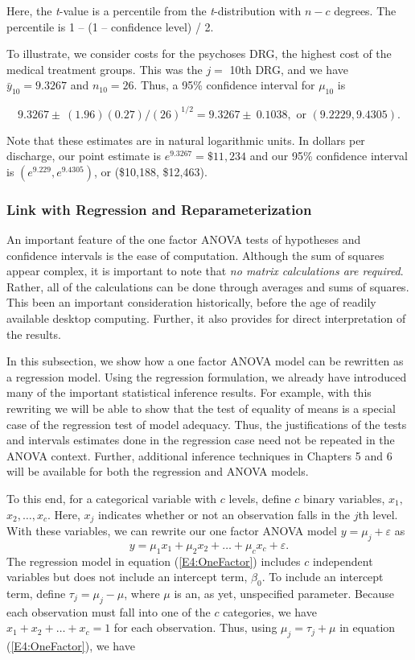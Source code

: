 \noindent Here, the \textit{t}-value is a percentile from the
\textit{t}-distribution with $n-c$ degrees. The percentile is 1 --
(1 -- confidence level) / 2.

To illustrate, we consider costs for the psychoses DRG, the highest cost of
the medical treatment groups. This was the $j=$ 10th DRG, and we have $\bar{y%
}_{10}=9.3267$ and $n_{10}=26$. Thus, a 95\% confidence interval for $\mu
_{10}$ is

\begin{equation*}
9.3267\pm \ (1.96)(0.27)/(26)^{1/2}=9.3267\pm \ 0.1038,\text{ or }%
(9.2229,9.4305).
\end{equation*}

Note that these estimates are in natural logarithmic units. In dollars per
discharge, our point estimate is $e^{9.3267}=\$11,234$ and our 95\%
confidence interval is $(e^{9.229},e^{9.4305})$, or (\$10,188, \$12,463).

\subsubsection*{Link with Regression and Reparameterization}

An important feature of the one factor ANOVA tests of hypotheses and
confidence intervals is the ease of computation. Although the sum of
squares appear complex, it is important to note that \emph{no matrix
calculations are required}. Rather, all of the calculations can be
done through averages and sums of squares. This been an important
consideration historically, before the age of readily available
desktop computing. Further, it also provides for direct
interpretation of the results.

In this subsection, we show how a one factor ANOVA model can be
rewritten as a regression model. Using the regression formulation,
we already have introduced many of the important statistical
inference results. For example, with this rewriting we will be able
to show that the test of equality of means is a special case of the
regression test of model adequacy. Thus, the justifications of the
tests and intervals estimates done in the regression case need not
be repeated in the ANOVA context. Further, additional inference
techniques in Chapters 5 and 6 will be available for both the
regression and ANOVA models.

To this end, for a categorical variable with $c$ levels, define $c$
binary variables, $x_1,$ $x_2,\ldots ,x_{c}$. Here, $x_{j}$
indicates whether or not an observation falls in the $j$th level.
With these variables, we can rewrite our one factor ANOVA model $
y=\mu_{j}+ \varepsilon$ as
\begin{equation}\label{E4:OneFactor}
y=\mu_1x_1+\mu_2x_2+\ldots +\mu_cx_{c}+\varepsilon.
\end{equation}
The regression model in equation (\ref{E4:OneFactor}) includes $c$
independent variables but does not include an intercept term, $\beta
_0$. To include an intercept term, define $\tau_{j}=\mu_{j}-\mu $,
where $\mu $ is an, as yet, unspecified parameter. Because each
observation must fall into one of the $c$ categories, we have
$x_1+x_2+\ldots +x_{c}=1$ for each observation. Thus, using $\mu
_{j} = \tau_j + \mu $ in equation (\ref{E4:OneFactor}), we have

